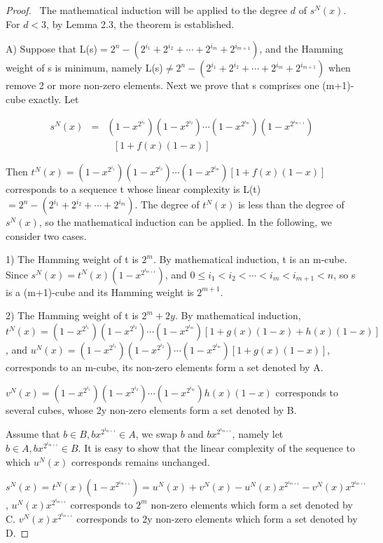 \documentclass[10pt,conference,twocolumn]{IEEEtran}
\begin{document}
\begin{proof}\
The mathematical induction will be applied to the degree $d$ of
$s^N(x)$. For $d <3$, by Lemma 2.3, the theorem is established.

A) Suppose that
L(s)$=2^n-(2^{i_1}+2^{i_2}+\cdots+2^{i_m}+2^{i_{m+1}})$, and the
Hamming weight of s is minimum, namely
L(s)$\ne2^n-(2^{i_1}+2^{i_2}+\cdots+2^{i_m}+2^{i_{m+1}})$ when
remove 2 or more non-zero elements. Next we prove that s comprises
one (m+1)-cube exactly. Let

\begin{eqnarray*}
s^N(x)&=&(1-x^{2^{i_1}})(1-x^{2^{i_2}})\cdots(1-x^{2^{i_m}})(1-x^{2^{i_{m+1}}})\\
&&\ \ \ [1+f(x)(1-x)]
\end{eqnarray*}

Then
$t^N(x)=(1-x^{2^{i_1}})(1-x^{2^{i_2}})\cdots(1-x^{2^{i_m}})[1+f(x)(1-x)]$
corresponds to a sequence t whose linear complexity is
L(t)$=2^n-(2^{i_1}+2^{i_2}+\cdots+2^{i_m})$. The degree of $t^N(x)$
is less than the degree of $s^N(x)$, so the mathematical induction
can be applied. In the following, we consider two cases.

1) The Hamming weight of t is $2^m$. By mathematical induction, t is
an m-cube. Since  $s^N(x)=t^N(x)(1-x^{2^{i_{m+1}}})$, and  $0\le
i_1< i_2<\cdots<i_m<i_{m+1}<n$, so s is a (m+1)-cube and its Hamming
weight is $2^{m+1}$.

2)  The Hamming weight of t is $2^m+2y$. By mathematical induction,
$t^N(x)=(1-x^{2^{i_1}})(1-x^{2^{i_2}})\cdots(1-x^{2^{i_m}})[1+g(x)(1-x)+h(x)(1-x)]$,
and
$u^N(x)=(1-x^{2^{i_1}})(1-x^{2^{i_2}})\cdots(1-x^{2^{i_m}})[1+g(x)(1-x)]$,
corresponds to an m-cube, its non-zero elements form a set denoted
by A.

$v^N(x)=(1-x^{2^{i_1}})(1-x^{2^{i_2}})\cdots(1-x^{2^{i_m}})h(x)(1-x)$
corresponds to several cubes, whose 2y non-zero elements form a set
denoted by B.

Assume that  $b\in B, bx^{2^{i_{m+1}}}\in A$, we swap $b$ and
$bx^{2^{i_{m+1}}}$, namely let  $b\in A, bx^{2^{i_{m+1}}}\in B$. It
is easy to show that the linear complexity of the sequence to which
$u^N(x)$ corresponds remains unchanged.

$s^N(x)=t^N(x)(1-x^{2^{i_{m+1}}})=u^N(x)+v^N(x)-u^N(x)x^{2^{i_{m+1}}}-v^N(x)x^{2^{i_{m+1}}}$,
$u^N(x)x^{2^{i_{m+1}}}$ corresponds to $2^m$ non-zero elements which
form a set denoted by C. $v^N(x)x^{2^{i_{m+1}}}$ corresponds to 2y
non-zero elements which form a set denoted by D.


\end{proof}
\end{document}
